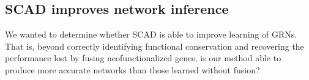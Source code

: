 \documentclass[11pt]{article}
\begin{document}
\subsection{SCAD improves network inference}
We wanted to determine whether SCAD is able to improve learning of GRNs. That is, beyond correctly identifying functional conservation and recovering the performance lost by fusing neofunctionalized genes, is our method able to produce more accurate networks than those learned without fusion? 



\end{document}
